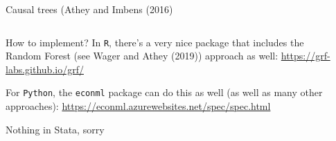 \documentclass[notes,11pt, aspectratio=169]{beamer}
\newenvironment{wideitemize}{\itemize\addtolength{\itemsep}{10pt}}{\enditemize}
\begin{document}
\begin{frame}{Causal trees (Athey and Imbens (2016)}
    \begin{columns}[onlytextwidth, T] %
      \begin{column}{.5\textwidth}
        \begin{wideitemize}
        \item<1-> How to implement? In \texttt{R}, there's a very nice
          package that includes the Random Forest (see Wager and Athey (2019)) approach as well:
          \url{https://grf-labs.github.io/grf/}
        \item<2-> For \texttt{Python}, the \texttt{econml} package can do
          this as well (as well as many other approaches):
          \url{https://econml.azurewebsites.net/spec/spec.html}
        \item<3-> Nothing in Stata, sorry
        \end{wideitemize}
      \end{column}%
      \hfill%
      \begin{column}{.5\textwidth}

\end{column}
\end{columns}
\end{frame}
\end{document}
